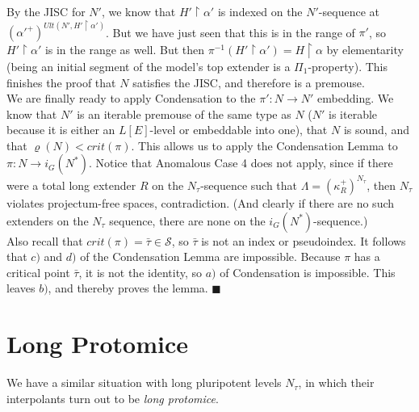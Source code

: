 \documentclass[12pt]{article}
\begin{document}
By the JISC for $N'$, we know that $H' \restriction \alpha'$ is indexed on the $N'$-sequence at $(\alpha'^+ )^{Ult (N' , H' \restriction \alpha' )}$.  But we have just seen that this is in the range of $\pi'$, so $H' \restriction \alpha'$ is in the range as well.  But then $\pi^{-1} ( H' \restriction \alpha' ) = H \restriction \alpha$ by elementarity (being an initial segment of the model's top extender is a $\Pi_1$-property).  This finishes the proof that $N$ satisfies the JISC, and therefore is a premouse.\\  

We are finally ready to apply Condensation to the $\pi' : N \longrightarrow N'$ embedding.  We know that $N'$ is an iterable premouse of the same type as $N$ ($N'$ is iterable because it is either an $L[E]$-level or embeddable into one), that $N$ is sound, and that $\varrho (N) < crit(\pi )$.  This allows us to apply the Condensation Lemma to $\pi : N \longrightarrow i_G (N^*)$.  Notice that Anomalous Case 4 does not apply, since if there were a total long extender $R$ on the $N_\tau$-sequence such that $\Lambda = (\kappa_R^+)^{N_\tau}$, then $N_\tau$ violates projectum-free spaces, contradiction.  (And clearly if there are no such extenders on the $N_\tau$ sequence, there are none on the $i_G (N^*)$-sequence.)\\

Also recall that $crit (\pi) = \bar{\tau} \in \mathcal{S}$, so $\bar{\tau}$ is not an index or pseudoindex.  It follows that $c)$ and $d)$ of the Condensation Lemma are impossible.  Because $\pi$ has a critical point $\bar{\tau}$, it is not the identity, so $a)$ of Condensation is impossible.  This leaves $b)$, and thereby proves the lemma.  $\blacksquare$\\








\section{Long Protomice}














We have a similar situation with long pluripotent levels $N_\tau$, in which their interpolants turn out to be \textit{long protomice}.\\
\end{document}
